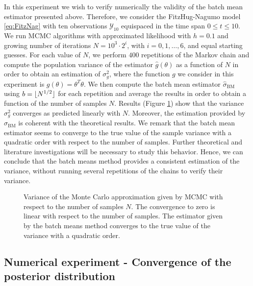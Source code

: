In this experiment we wish to verify numerically the validity of the batch mean estimator presented above. Therefore, we consider the FitzHug-Nagumo model \eqref{eq:FitzNag} with ten observations $\mathcal{Y}_{10}$ equispaced in the time span $0 \leq t \leq 10$. We run MCMC algorithms with approximated likelihood with $h = 0.1$ and growing number of iterations $N = 10^3 \cdot 2^i$, with $i = 0, 1, \ldots, 6$, and equal starting guesses. For each value of $N$, we perform $400$ repetitions of the Markov chain and compute the population variance of the estimator $\hat g(\theta)$ as a function of $N$ in order to obtain an estimation of $\sigma^2_g$, where the function $g$ we consider in this experiment is $g(\theta) = \theta^T\theta$. We then compute the batch mean estimator $\hat \sigma_{\mathrm{BM}}$ using $b = \lfloor N^{1/2}\rfloor$ for each repetition and average the results in order to obtain a function of the number of samples $N$. Results (Figure \ref{fig:BatchMeans}) show that the variance $\sigma^2_g$ converges as predicted linearly with $N$. Moreover, the estimation provided by $\hat \sigma_{\mathrm{BM}}$ is coherent with the theoretical results. We remark that the batch mean estimator seems to converge to the true value of the sample variance with a quadratic order with respect to the number of samples. Further theoretical and literature investigations will be necessary to study this behavior. Hence, we can conclude that the batch means method provides a consistent estimation of the variance, without running several repetitions of the chains to verify their variance.

\begin{figure}[t]
	\centering
	\begin{subfigure}{0.49\linewidth}
		\centering
		\resizebox{1.0\linewidth}{!}{}
	\end{subfigure}
	\begin{subfigure}{0.49\linewidth}
		\centering
		\resizebox{1.0\linewidth}{!}{}
	\end{subfigure}
	\caption{Variance of the Monte Carlo approximation given by MCMC with respect to the number of samples $N$. The convergence to zero is linear with respect to the number of samples. The estimator given by the batch means method converges to the true value of the variance with a quadratic order.}
	\label{fig:BatchMeans}
\end{figure}

\subsection{Numerical experiment - Convergence of the posterior distribution}

